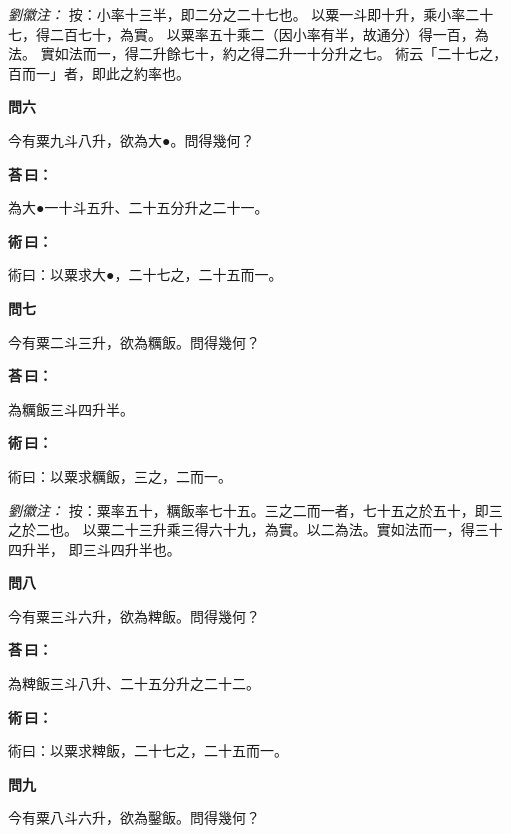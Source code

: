 \documentclass[11pt,a4paper]{article}
\newenvironment{problem}[1][]{%
  \par\vspace{0.6em}\noindent\textcolor{problemcolor}{\textbf{問\ignorespaces#1\unskip}\hspace{0.5em}}%
  \ignorespaces
}{\par\vspace{0.4em}}
\newenvironment{answer}{%
  \par\noindent\textcolor{answercolor}{\textbf{荅\,曰：}}%
  \ignorespaces
}{\par\vspace{0.3em}}
\newenvironment{method}{%
  \par\noindent\textcolor{methodcolor}{\textbf{術\,曰：}}%
  \ignorespaces
}{\par\vspace{0.4em}}
\newenvironment{liuhuicomm}{%
  \par\vspace{0.3em}\noindent\textcolor{commentarycolor}{\small\textit{劉徽注：}}}%
  {\par\vspace{0.5em}}
\begin{document}
\begin{liuhuicomm}
按：小\textbullet{}率十三半，即二分之二十七也。
以粟一斗即十升，乘小\textbullet{}率二十七，得二百七十，為實。
以粟率五十乘二（因小\textbullet{}率有半，故通分）得一百，為法。
實如法而一，得二升餘七十，約之得二升一十分升之七。
術云「二十七之，百而一」者，即此之約率也。
\end{liuhuicomm}

\begin{problem}[六]
今有粟九斗八升，欲為大●。問得幾何？
\end{problem}

\begin{answer}
為大●一十斗五升、二十五分升之二十一。
\end{answer}

\begin{method}
術曰：以粟求大●，二十七之，二十五而一。
\end{method}

\begin{problem}[七]
今有粟二斗三升，欲為糲飯。問得幾何？
\end{problem}

\begin{answer}
為糲飯三斗四升半。
\end{answer}

\begin{method}
術曰：以粟求糲飯，三之，二而一。
\end{method}

\begin{liuhuicomm}
按：粟率五十，糲飯率七十五。三之二而一者，七十五之於五十，即三之於二也。
以粟二十三升乘三得六十九，為實。以二為法。實如法而一，得三十四升半，
即三斗四升半也。
\end{liuhuicomm}

\begin{problem}[八]
今有粟三斗六升，欲為粺飯。問得幾何？
\end{problem}

\begin{answer}
為粺飯三斗八升、二十五分升之二十二。
\end{answer}

\begin{method}
術曰：以粟求粺飯，二十七之，二十五而一。
\end{method}

\begin{problem}[九]
今有粟八斗六升，欲為鑿飯。問得幾何？
\end{problem}
\end{document}
